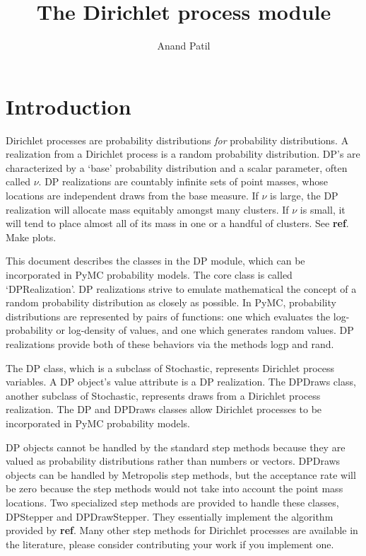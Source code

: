\documentclass{manual}
\begin{document}
\author{Anand Patil}
\title{The Dirichlet process module}
\maketitle
\tableofcontents

\chapter{Introduction}

Dirichlet processes are probability distributions \emph{for} probability distributions. A realization from a Dirichlet process is a random probability distribution. DP's are characterized by a `base' probability distribution and a scalar parameter, often called $\nu$. DP realizations are countably infinite sets of point masses, whose locations are independent draws from the base measure. If $\nu$ is large, the DP realization will allocate mass equitably amongst many clusters. If $\nu$ is small, it will tend to place almost all of its mass in one or a handful of clusters. See \textbf{ref}. Make plots.

This document describes the classes in the DP module, which can be incorporated in PyMC probability models. The core class is called `DPRealization'. DP realizations strive to emulate mathematical the concept of a random probability distribution as closely as possible. In PyMC, probability distributions are represented by pairs of functions: one which evaluates the log-probability or log-density of values, and one which generates random values. DP realizations provide both of these behaviors via the methods logp and rand.

The DP class, which is a subclass of Stochastic, represents Dirichlet process variables. A DP object's value attribute is a DP realization. The DPDraws class, another subclass of Stochastic, represents draws from a Dirichlet process realization. The DP and DPDraws classes allow Dirichlet processes to be incorporated in PyMC probability models.

DP objects cannot be handled by the standard step methods because they are valued as probability distributions rather than numbers or vectors. DPDraws objects can be handled by Metropolis step methods, but the acceptance rate will be zero because the step methods would not take into account the point mass locations. Two specialized step methods are provided to handle these classes, DPStepper and DPDrawStepper. They essentially implement the algorithm provided by \textbf{ref}. Many other step methods for Dirichlet processes are available in the literature, please consider contributing your work if you implement one.
\end{document}
